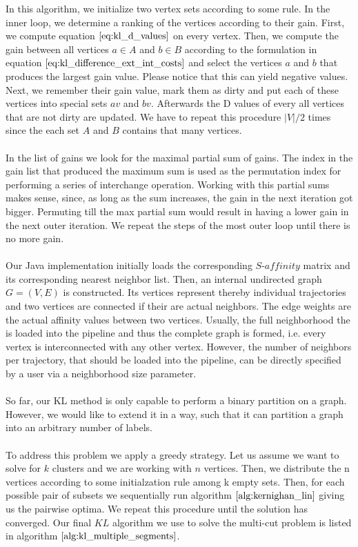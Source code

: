 In this algorithm, we initialize two vertex sets according to some rule. In the inner loop, we determine a ranking of the vertices according to their gain. First, we compute equation $\ref{eq:kl_d_values}$ on every vertex. Then, we compute the gain between all vertices $a \in A$ and $b \in B$ according to the formulation in equation $\ref{eq:kl_difference_ext_int_costs}$ and select the vertices $a$ and $b$ that produces the largest gain value. Please notice that this can yield negative values. Next, we remember their gain value, mark them as dirty and put each of these vertices into special sets $av$ and $bv$. Afterwards the D values of every all vertices that are not dirty are updated. We have to repeat this procedure $|V|/2$ times since the each set $A$ and $B$ contains that many vertices. \\ \\
In the list of gains we look for the maximal partial sum of gains. The index in the gain list that produced the maximum sum is used as the permutation index for performing a series of interchange operation. Working with this partial sums makes sense, since, as long as the sum increases, the gain in the next iteration got bigger. Permuting till the max partial sum would result in having a lower gain in the next outer iteration. We repeat the steps of the most outer loop until there is no more gain. \\ \\
Our Java implementation initially loads the corresponding $\textit{S-affinity}$ matrix and its corresponding nearest neighbor list. Then, an internal undirected graph $G = \left( V, E \right)$ is constructed. Its vertices represent thereby individual trajectories and two vertices are connected if their are actual neighbors. The edge weights are the actual affinity values between two vertices. Usually, the full neighborhood the is loaded into the pipeline and thus the complete graph is formed, i.e. every vertex is interconnected with any other vertex. However, the number of neighbors per trajectory, that should be loaded into the pipeline, can be directly specified by a user via a neighborhood size parameter. \\ \\ 
So far, our KL method is only capable to perform a binary partition on a graph. However, we would like to extend it in a way, such that it can partition a graph into an arbitrary number of labels. \\ \\
To address this problem we apply a greedy strategy. Let us assume we want to solve for $k$ clusters and we are working with $n$ vertices. Then, we distribute the n vertices according to some initialzation rule among k empty sets. Then, for each possible pair of subsets we sequentially run algorithm $\ref{alg:kernighan_lin}$ giving us the pairwise optima. We repeat this procedure until the solution has converged. Our final $KL$ algorithm we use to solve the multi-cut problem is listed in algorithm $\ref{alg:kl_multiple_segments}$.
